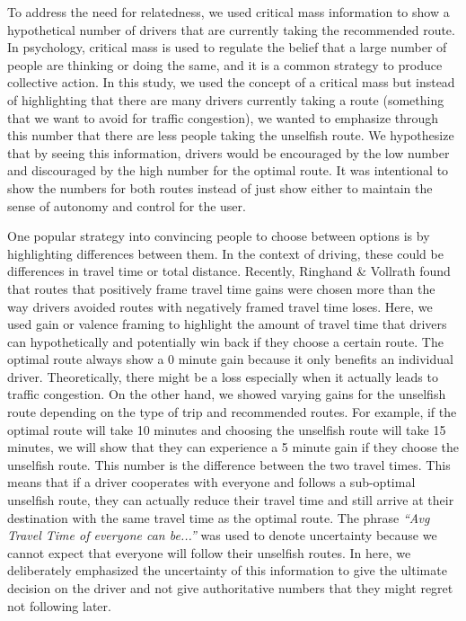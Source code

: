 To address the need for relatedness, we used critical mass information to show a hypothetical number of drivers that are currently taking the recommended route. In psychology, critical mass is used to regulate the belief that a large number of people are thinking or doing the same, and it is a common strategy to produce collective action\cite{oliver1985theory}. In this study, we used the concept of a critical mass but instead of highlighting that there are many drivers currently taking a route (something that we want to avoid for traffic congestion), we wanted to emphasize through this number that there are less people taking the unselfish route. We hypothesize that by seeing this information, drivers would be encouraged by the low number and discouraged by the high number for the optimal route. It was intentional to show the numbers for both routes instead of just show either to maintain the sense of autonomy and control for the user.

One popular strategy into convincing people to choose between options is by highlighting differences between them. In the context of driving, these could be differences in travel time or total distance. Recently, Ringhand \& Vollrath\cite{ringhand2019faster} found that routes that positively frame travel time gains were chosen more than the way drivers avoided routes with negatively framed travel time loses. Here, we used gain or valence framing to highlight the amount of travel time that drivers can hypothetically and potentially win back if they choose a certain route. The optimal route always show a 0 minute gain because it only benefits an individual driver. Theoretically, there might be a loss especially when it actually leads to traffic congestion. On the other hand, we showed varying gains for the unselfish route depending on the type of trip and recommended routes. For example, if the optimal route will take 10 minutes and choosing the unselfish route will take 15 minutes, we will show that they can experience a 5 minute gain if they choose the unselfish route. This number is the difference between the two travel times. This means that if a driver cooperates with everyone and follows a sub-optimal unselfish route, they can actually reduce their travel time and still arrive at their destination with the same travel time as the optimal route. The phrase \textit{``Avg Travel Time of everyone can be...''} was used to denote uncertainty because we cannot expect that everyone will follow their unselfish routes. In here, we deliberately emphasized the uncertainty of this information to give the ultimate decision on the driver and not give authoritative numbers that they might regret not following later. 

